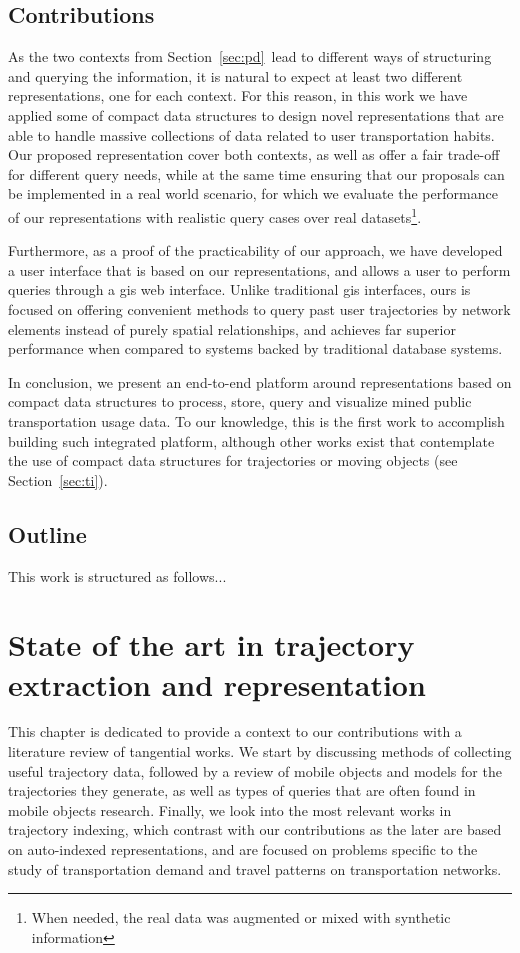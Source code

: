 \documentclass[a4paper,10pt,twoside]{book}
\begin{document}
	\section{Contributions}
	As the two contexts from Section~\ref{sec:pd}~lead to different ways of structuring and querying the information, it is natural to expect at least two different representations, one for each context. For this reason, in this work we have applied some of compact data structures to design novel representations that are able to handle massive collections of data related to user transportation habits. Our proposed representation cover both contexts, as well as offer a fair trade-off for different query needs, while at the same time ensuring that our proposals can be implemented in a real world scenario, for which we evaluate the performance of our representations with realistic query cases over real datasets\footnote{When needed, the real data was augmented or mixed with synthetic information}.
	
	Furthermore, as a proof of the practicability of our approach, we have developed a user interface that is based on our representations, and allows a user to perform queries through a \gls{gis} web interface. Unlike traditional \gls{gis} interfaces, ours is focused on offering convenient methods to query past user trajectories by network elements instead of purely spatial relationships, and achieves far superior performance when compared to systems backed by traditional database systems.
	
	In conclusion, we present an end-to-end platform around representations based on compact data structures to process, store, query and visualize mined public transportation usage data. To our knowledge, this is the first work to accomplish building such integrated platform, although other works exist that contemplate the use of compact data structures for trajectories or moving objects (see Section~\ref{sec:ti}).
	
	\section{Outline}
	This work is structured as follows...
	
\chapter{State of the art in trajectory extraction and representation}
    This chapter is dedicated to provide a context to our contributions with a literature review of tangential works. We start by discussing methods of collecting useful trajectory data, followed by a review of mobile objects and models for the trajectories they generate, as well as types of queries that are often found in mobile objects research. Finally, we look into the most relevant works in trajectory indexing, which contrast with our contributions as the later are based on auto-indexed representations, and are focused on problems specific to the study of transportation demand and travel patterns on transportation networks.
\end{document}
